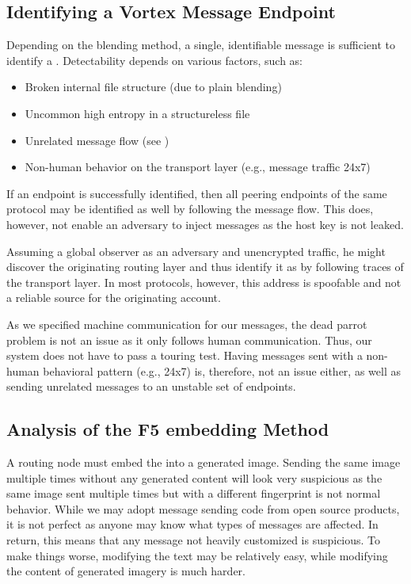 \subsection{Identifying a Vortex Message Endpoint}
Depending on the blending method, a single, identifiable message is sufficient to identify a \VortexNode. Detectability depends on various factors, such as:

\begin{itemize}
	\item Broken internal file structure (due to plain blending)
	\item Uncommon high entropy in a structureless file
	\item Unrelated message flow (see \cite{oakland2013-parrot})
	\item Non-human behavior on the transport layer (e.g., message traffic 24x7)
\end{itemize}

If an endpoint is successfully identified, then all peering endpoints of the same protocol may be identified as well by following the message flow. This does, however, not enable an adversary to inject messages as the host key is not leaked. 

Assuming a global observer as an adversary and unencrypted traffic, he might discover the originating routing layer and thus identify it as \VortexNode{} by following traces of the transport layer. In most protocols, however, this address is spoofable and not a reliable source for the originating account.

As we specified machine communication for our messages, the dead parrot problem\cite{oakland2013-parrot} is not an issue as it only follows human communication. Thus, our system does not have to pass a touring test. Having messages sent with a non-human behavioral pattern (e.g., 24x7) is, therefore, not an issue either, as well as sending unrelated messages to an unstable set of endpoints. 

\subsection{Analysis of the F5 embedding Method}
A routing node must embed the \VortexMessage into a generated image. Sending the same image multiple times without any generated content will look very suspicious as the same image sent multiple times but with a different fingerprint is not normal behavior. While we may adopt message sending code from open source products, it is not perfect as anyone may know what types of messages are affected. In return, this means that any message not heavily customized is suspicious. To make things worse, modifying the text may be relatively easy, while modifying the content of generated imagery is much harder.


